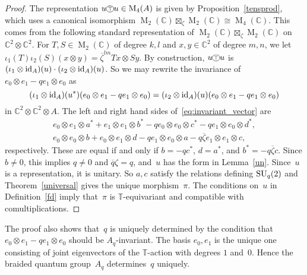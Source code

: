 \documentclass[a4paper]{amsart}
\numberwithin{equation}{section}
\theoremstyle{definition}
\theoremstyle{remark}
\begin{document}
\begin{proof}
  The representation $u{\mathbin{\xymatrix{*+<.7ex>[o][F-]{\scriptstyle\top}}}} u\in {\operatorname{M}}_4(A)$ is given by
  Proposition~\ref{tensprod}, which uses a canonical isomorphism
  ${\operatorname{M}}_2({{\mathbb C}}) \boxtimes_\zeta{\operatorname{M}}_2({{\mathbb C}}) \cong {\operatorname{M}}_4({{\mathbb C}})$.  This
  comes from the following standard representation of
  ${\operatorname{M}}_2({{\mathbb C}})\boxtimes_\zeta {\operatorname{M}}_2({{\mathbb C}})$ on ${{\mathbb C}}^2\otimes
  {{\mathbb C}}^2$.  For $T,S\in {\operatorname{M}}_2({{\mathbb C}})$ of degree $k,l$ and
  $x,y\in{{\mathbb C}}^2$ of degree $m,n$, we let $\iota_1(T) \iota_2(S)
  (x\otimes y) = \overline\zeta^{l m}Tx\otimes Sy$.  By construction,
  $u{\mathbin{\xymatrix{*+<.7ex>[o][F-]{\scriptstyle\top}}}} u$ is $(\iota_1\otimes{\textup{id}}_A)(u)\cdot (\iota_2\otimes
  {\textup{id}}_A)(u)$.  So we may rewrite the invariance of $e_0\otimes
  e_1-qe_1\otimes e_0$ as
  \begin{equation}
    \label{eq:invariant_vector}
    (\iota_1\otimes {\textup{id}}_A)(u^*)(e_0\otimes e_1-qe_1\otimes e_0)
    = (\iota_2\otimes {\textup{id}}_A)(u)(e_0\otimes e_1-qe_1\otimes e_0)
  \end{equation}
  in ${{\mathbb C}}^2\otimes{{\mathbb C}}^2\otimes A$.  The left and right hand sides
  of~\eqref{eq:invariant_vector} are
  \begin{gather*}
    e_0\otimes e_1 \otimes a^*+e_1\otimes e_1\otimes b^* - q e_0\otimes
    e_0\otimes c^* - qe_1\otimes e_0\otimes d^*,\\
    e_0\otimes e_0\otimes b + e_0\otimes e_1\otimes d
    - qe_1\otimes e_0\otimes a
    - q \overline{\zeta} e_1\otimes e_1\otimes c,
  \end{gather*}
  respectively.  These are equal if and only if $b = -q c^*$, $d =
  a^*$, and $b^* = -q\overline\zeta c$.  Since $b\neq0$, this implies
  \(q\neq0\) and ${\overline{q}}\zeta=q$, and~\(u\) has the form in
  Lemma~\ref{un}.  Since~$u$ is a representation, it is unitary.  So
  $a,c$ satisfy the relations defining ${\textup{SU}}_q(2)$ and
  Theorem~\ref{universal} gives the unique morphism~$\pi$.  The
  conditions on~$u$ in Definition~\ref{fd} imply that~$\pi$ is
  $\mathbb{T}${\nobreakdash}-equivariant and compatible with comultiplications.
\end{proof}

The proof also shows that~\(q\) is uniquely determined by the
condition that \(e_0\otimes e_1 -qe_1\otimes e_0\) should be
\(A_q\){\nobreakdash}-invariant.  The basis \(e_0,e_1\) is the unique one
consisting of joint eigenvectors of the \(\mathbb{T}\){\nobreakdash}-action
with degrees \(1\) and~\(0\).  Hence the braided quantum
group~\(A_q\) determines~\(q\) uniquely.
\end{document}

